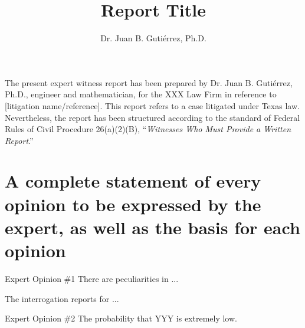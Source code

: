 \documentclass[12pt,reqno]{amsart}
\newcommand{\vs}{\vspace*{0.1in}\noindent}
\begin{document}
	
		
	\title[Report Title]{Report Title}	
	\author[Dr. Juan B. Gutiérrez, Ph.D.]{Dr. Juan B. Gutiérrez, Ph.D.}	
	\address{GUVO Solutions LLC}	
	

	
	
	\maketitle
	
	The present expert witness report has been prepared by Dr. Juan B. Gutiérrez, Ph.D., engineer and mathematician, for the XXX Law Firm  in reference to [litigation name/reference]. This report refers to a case litigated under Texas law. Nevertheless, the report has been structured according to the standard of Federal Rules of Civil Procedure 26(a)(2)(B), ``\textit{Witnesses Who Must Provide a Written Report}.''
		
	{\scshape \small \tableofcontents}
	
	\section{A complete statement of every opinion to be expressed by the expert, as well as the basis for each opinion}
	\vs
	\begin{myblock}{Expert Opinion \#1}
		There are peculiarities in ...
	\end{myblock}
	\vs
	
	The interrogation reports for ...
		

	\vs
	\begin{myblock}{Expert Opinion \#2}
		The probability that YYY  is extremely low.  
	\end{myblock}
	\vs
 
\end{document}
